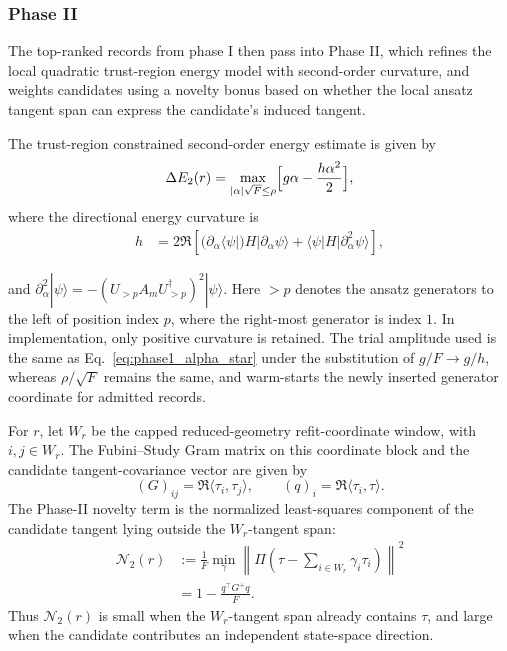 \documentclass[
  reprint,
  amsmath,
  amssymb,
  aps,
  pra,
  nofootinbib,
  superscriptaddress,
  floatfix
]{revtex4-2}
\newcommand{\ket}[1]{|#1\rangle}
\begin{document}
\subsubsection{Phase II}

The top-ranked records from phase I then pass into Phase II, which refines the local quadratic trust-region energy model with second-order curvature, and weights candidates using a novelty bonus based on whether the local ansatz tangent span can express the candidate's induced tangent. 

The trust-region constrained second-order energy estimate is given by
\begin{equation}
\Delta E_{2}(r)
=\max_{|\alpha|\sqrt{F}\le\rho}
\Bigl[g\alpha -\frac{h\alpha^2}{2}\Bigr],
\label{eq:phase2_gain}
\end{equation}
where the directional energy curvature is
\begin{align}
h&=
2\Re\!\left[
(\partial_{\alpha}\langle \psi|)H|\partial_{\alpha}\psi\rangle
+\langle\psi|H|\partial^2_{\alpha}\psi\rangle
\right],
\label{eq:phase2_hessian}
\end{align}
  
and $\partial^2_{\alpha}\ket{\psi} =-(U_{>p}A_mU_{>p}^{\dagger})^2\ket{\psi}.$ Here \(>p\) denotes the ansatz generators to the left of position index \(p\), where the right-most generator is index \(1\). In implementation, only positive curvature is retained. The trial amplitude used is the same as Eq.~\ref{eq:phase1_alpha_star} under the substitution of $g/F \to g / h$, whereas $\rho/\sqrt{F}$ remains the same, and warm-starts the newly inserted generator coordinate for admitted records.

For \(r\), let \(W_r\) be the capped reduced-geometry refit-coordinate window, with \(i,j\in W_r\). The Fubini--Study Gram matrix on this coordinate block and the candidate tangent-covariance vector are given by
\begin{equation*}
(G)_{ij}=\Re\langle\tau_i,\tau_j\rangle,
\qquad
(q)_i=\Re\langle\tau_i,\tau\rangle.
\end{equation*}
The Phase-II novelty term is the normalized least-squares component of the candidate tangent lying outside the \(W_r\)-tangent span:
\begin{equation}
\begin{aligned}
\mathcal N_2(r)
&:=
\frac{1}{F}
\min_{\gamma}
\left\|
\Pi\left(\tau-\sum_{i\in W_r}\gamma_i\tau_i\right)
\right\|^2 \\
&=
1-
\frac{q^{\top}G^+q}{F}.
\end{aligned}
\label{eq:phase2_novelty}
\end{equation}
Thus $\mathcal N_2(r)$ is small when the \(W_r\)-tangent span already contains $\tau$, and large when the candidate contributes an independent state-space direction.
\end{document}
